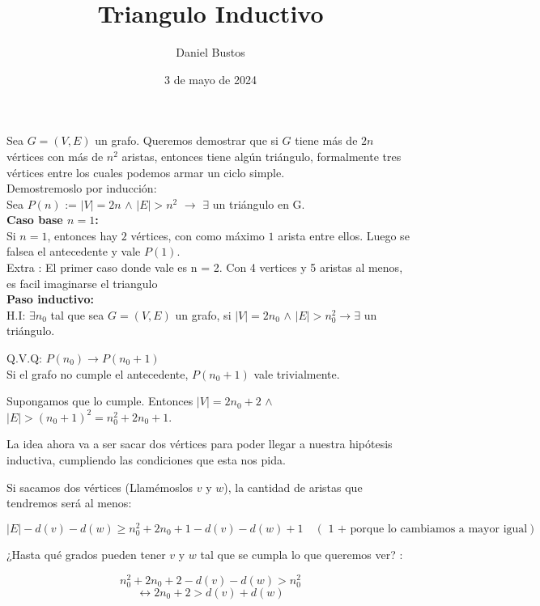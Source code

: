\documentclass{article}
\author{Daniel Bustos}
\date{3 de mayo de 2024}
\title{Triangulo Inductivo}
\begin{document}
\maketitle
Sea $G = (V,E)$ un grafo. Queremos demostrar que si $G$ tiene más de $2n$ vértices con más de $n^2$ aristas, entonces tiene algún triángulo, formalmente tres vértices entre los cuales podemos armar un ciclo simple.\\

Demostremoslo por inducción:\\

Sea $P(n)$ := $|V| = 2n$ $\land$ $|E| > n^2$ $\rightarrow$ $\exists$ un triángulo en G.\\

\textbf{Caso base $n = 1$:} \\

Si $n = 1$, entonces hay $2$ vértices, con como máximo $1$ arista entre ellos. Luego se falsea el antecedente y vale $P(1)$.\\

Extra : El primer caso donde vale es n = 2. Con 4 vertices y 5 aristas al menos, es facil imaginarse el triangulo\\
\textbf{Paso inductivo:}\\

H.I: $\exists n_0$ tal que sea $G = (V,E)$ un grafo, si $|V| = 2n_0$ $\land$ $|E| > n_0^2 \rightarrow \exists$ un triángulo.

Q.V.Q: $P(n_0) \rightarrow P(n_0 + 1)$ \\

Si el grafo no cumple el antecedente, $P(n_0 + 1)$ vale trivialmente.

Supongamos que lo cumple. Entonces $|V| = 2n_0 + 2$ $\land$ $|E| > (n_0 + 1)^2 = n_0^2 + 2n_0 + 1$.

La idea ahora va a ser sacar dos vértices para poder llegar a nuestra hipótesis inductiva, cumpliendo las condiciones que esta nos pida.

Si sacamos dos vértices (Llamémoslos $v$ y $w$), la cantidad de aristas que tendremos será al menos: 

\[
|E| - d(v) - d(w) \geq n_0^2 + 2n_0 + 1  - d(v) - d(w) + 1 \quad (\text{ 1 + porque lo cambiamos a mayor igual})
\]

¿Hasta qué grados pueden tener $v$ y $w$ tal que se cumpla lo que queremos ver? :

\[
n_0^2 + 2n_0 + 2 - d(v) - d(w) > n_0^2   
\]
\[
 \leftrightarrow  2n_0 + 2 > d(v) + d(w)
\]
\end{document}
